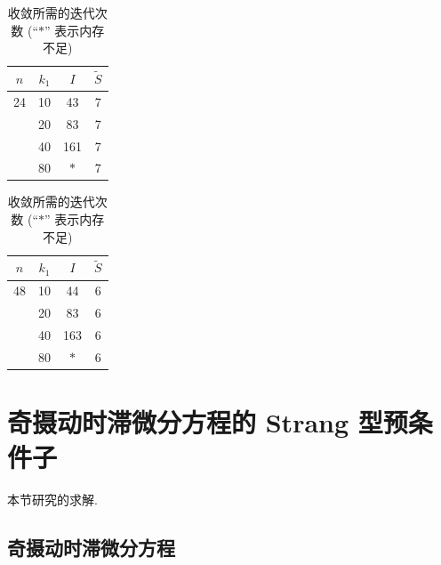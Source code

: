 \begin{table}[htbp]
  \centering
  \caption{收敛所需的迭代次数 (``$*$'' 表示内存不足)}
  \label{tab:9-3}
  \begin{tabular}{cccc}
    \toprule
    $n$ & $k_1$ & $I$ & $\widetilde{S}$\\ \midrule
    24 & 10 & 43  & 7\\
       & 20 & 83  & 7\\
       & 40 & 161 & 7\\
       & 80 & $*$ & 7\\ \bottomrule
  \end{tabular}
  \hspace{2em}
  \begin{tabular}{cccc}
    \toprule
    $n$ & $k_1$ & $I$ & $\widetilde{S}$\\ \midrule
    48 & 10 & 44  & 6\\
       & 20 & 83  & 6\\
       & 40 & 163 & 6\\
       & 80 & $*$ & 6\\ \bottomrule
  \end{tabular}
\end{table}

\section{奇摄动时滞微分方程的 Strang 型预条件子}
\label{sec:9-6}

本节研究的求解.

\subsection{奇摄动时滞微分方程}
\label{sec:9-6-1}

